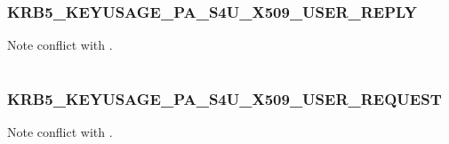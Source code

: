 \documentclass[letterpaper,10pt,english]{sphinxmanual}
\begin{document}
\subsubsection{KRB5\_KEYUSAGE\_PA\_S4U\_X509\_USER\_REPLY}
\label{appdev/refs/macros/KRB5_KEYUSAGE_PA_S4U_X509_USER_REPLY:krb5-keyusage-pa-s4u-x509-user-reply-data}\label{appdev/refs/macros/KRB5_KEYUSAGE_PA_S4U_X509_USER_REPLY:krb5-keyusage-pa-s4u-x509-user-reply}\label{appdev/refs/macros/KRB5_KEYUSAGE_PA_S4U_X509_USER_REPLY::doc}

\begin{fulllineitems}
\label{appdev/refs/macros/KRB5_KEYUSAGE_PA_S4U_X509_USER_REPLY:KRB5_KEYUSAGE_PA_S4U_X509_USER_REPLY}
\end{fulllineitems}


Note conflict with  .

\begin{tabulary}{\linewidth}{|L|L|}
\hline

 & 
\\\hline
\end{tabulary}



\subsubsection{KRB5\_KEYUSAGE\_PA\_S4U\_X509\_USER\_REQUEST}
\label{appdev/refs/macros/KRB5_KEYUSAGE_PA_S4U_X509_USER_REQUEST::doc}\label{appdev/refs/macros/KRB5_KEYUSAGE_PA_S4U_X509_USER_REQUEST:krb5-keyusage-pa-s4u-x509-user-request}\label{appdev/refs/macros/KRB5_KEYUSAGE_PA_S4U_X509_USER_REQUEST:krb5-keyusage-pa-s4u-x509-user-request-data}

\begin{fulllineitems}
\label{appdev/refs/macros/KRB5_KEYUSAGE_PA_S4U_X509_USER_REQUEST:KRB5_KEYUSAGE_PA_S4U_X509_USER_REQUEST}
\end{fulllineitems}


Note conflict with  .

\begin{tabulary}{\linewidth}{|L|L|}
\hline

 & 
\\\hline
\end{tabulary}
\end{document}
